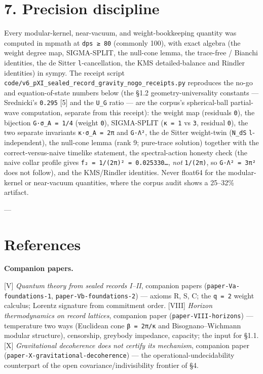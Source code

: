 \documentclass[11pt]{article}
\begin{document}
\section*{7. Precision discipline}
Every modular-kernel, near-vacuum, and weight-bookkeeping quantity was computed in mpmath at \texttt{dps ≥ 80} (commonly 100), with exact algebra (the weight degree map, SIGMA-SPLIT, the null-cone lemma, the trace-free / Bianchi identities, the de Sitter \texttt{l}-cancellation, the KMS detailed-balance and Rindler identities) in sympy. The receipt script \texttt{code/v6\_pXI\_sealed\_record\_gravity\_nogo\_receipts.py} reproduces the no-go and equation-of-state numbers below (the §1.2 geometry-universality constants — Srednicki's \texttt{0.295} [5] and the \texttt{U\_G} ratio — are the corpus's spherical-ball partial-wave computation, separate from this receipt): the weight map (residuals \texttt{0}), the bijection \texttt{G·σ\_A = 1/4} (weight \texttt{0}), SIGMA-SPLIT (\texttt{κ = 1} vs \texttt{3}, residual \texttt{0}), the two separate invariants \texttt{κ·σ\_A = 2π} and \texttt{G·Λ²}, the de Sitter weight-twin (\texttt{N\_dS} \texttt{l}-independent), the null-cone lemma (rank 9; pure-trace solution) together with the correct-versus-naive timelike statement, the spectral-action honesty check (the naive collar profile gives \texttt{f₂ = 1/(2π)² = 0.025330…}, \emph{not} \texttt{1/(2π)}, so \texttt{G·Λ² = 3π²} does not follow), and the KMS/Rindler identities. Never float64 for the modular-kernel or near-vacuum quantities, where the corpus audit shows a 25–32\% artifact.

---

\section*{References}
\textbf{Companion papers.}

[V] \emph{Quantum theory from sealed records I–II}, companion papers (\texttt{paper-Va-foundations-1}, \texttt{paper-Vb-foundations-2}) — axioms R, S, C; the \texttt{q = 2} weight calculus; Lorentz signature from commitment order. [VIII] \emph{Horizon thermodynamics on record lattices}, companion paper (\texttt{paper-VIII-horizons}) — temperature two ways (Euclidean cone \texttt{β = 2π/κ} and Bisognano–Wichmann modular structure), censorship, greybody impedance, capacity; the input for §1.1. [X] \emph{Gravitational decoherence does not certify its mechanism}, companion paper (\texttt{paper-X-gravitational-decoherence}) — the operational-undecidability counterpart of the open covariance/indivisibility frontier of §4.
\end{document}
